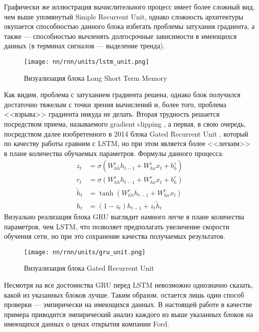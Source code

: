 \noindent Графически же иллюстрация вычислительного процесс имеет более сложный вид, чем выше упомянутый Simple Recurrent Unit, однако сложность архитектуры окупается способностью данного блока избегать проблемы затухания градиента, а также --- способностью вычленять долгосрочные зависимости в имеющихся данных (в терминах сигналов --- выделение тренда).
\begin{figure}[H]
	\centering
	\texttt{[image: nn/rnn/units/lstm\_unit.png]}
	\caption{Визуализация блока Long Short Term Memory}
	\label{fig::lstm_unit}
\end{figure}
Как видим, проблема с затуханием градиента решена, однако блок получился достаточно тяжелым с точки зрения вычислений и, более того, проблема <<взрыва>> градиента никуда не делать. Вторая трудность решается посредством приема, называемого gradient clipping \cite{mikolov2012statistical}, а первая, в свою очередь, посредством далее изобретенного в 2014 блока Gated Recurrent Unit \cite{cho2014learning}, который по качеству работы сравним с LSTM, но при этом является более <<легким>> в плане количества обучаемых параметров. Формулы данного процесса:
\begin{equation}
	\begin{split}
		z_t & = \sigma\left(W_{hh}^i h_{t - 1} + W_{hx}^i x_t + b_h^z\right)\\
		r_t & = \sigma\left(W_{hh}^r h_{t - 1} + W_{hx}^r x_t + b_h^r\right)\\
		\tilde{h}_t & = \tanh \left(W_{hh}^r h_{t - 1} + W_{hx}^r x_t\right)\\
		h_t & = (1 - z_t) h_{t - 1} + z_t \tilde{h}_t
	\end{split}
\end{equation}
\noindent Визуально реализация блока GRU выглядит намного легче в плане количества параметров, чем LSTM, что позволяет предполагать увеличение скорости обучения сети, но при это сохранение качества получаемых результатов.
\begin{figure}[H]
	\centering
	\texttt{[image: nn/rnn/units/gru\_unit.png]}
	\caption{Визуализация блока Gated Recurrent Unit}
	\label{fig::gru_unit}
\end{figure}
Несмотря на все достоинства GRU перед LSTM невозможно однозначно сказать, какой из указанных блоков лучше. Таким образом, остается лишь один способ проверки --- эмпирически на имеющихся данных. В настоящей работе в качестве примера приводится эмпирический анализ каждого из выше указанных блоков на имеющихся данных о ценах открытия компании Ford.

